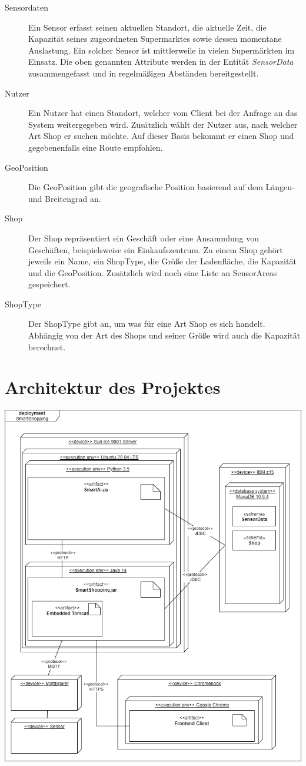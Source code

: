\documentclass[runningheads]{llncs}
\begin{document}
\begin{description}
	\item[Sensordaten] Ein Sensor erfasst seinen aktuellen Standort, die aktuelle Zeit, die Kapazität seines zugeordneten Supermarktes sowie dessen momentane Auslastung. Ein solcher Sensor ist mittlerweile in vielen Supermärkten im Einsatz. Die oben genannten Attribute werden in der Entität \textit{SensorData} zusammengefasst und in regelmäßigen Abständen bereitgestellt.
	\item[Nutzer] Ein Nutzer hat einen Standort, welcher vom Client bei der Anfrage an das System weitergegeben wird. Zusätzlich wählt der Nutzer aus, nach welcher Art Shop er suchen möchte. Auf dieser Basis bekommt er einen Shop und gegebenenfalls eine Route empfohlen.
	\item[GeoPosition] Die GeoPosition gibt die geografische Position basierend auf dem Längen- und Breitengrad an.
	\item[Shop] Der Shop repräsentiert ein Geschäft oder eine Ansammlung von Geschäften, beispielsweise ein Einkaufszentrum. Zu einem Shop gehört jeweils ein Name, ein ShopType, die Größe der Ladenfläche, die Kapazität und die GeoPosition. Zusätzlich wird noch eine Liste an SensorAreas gespeichert.
	\item[ShopType] Der ShopType gibt an, um was für eine Art Shop es sich handelt.
Abhängig von der Art des Shops und seiner Größe wird auch die Kapazität berechnet.
	
\end{description}


\section{Architektur des Projektes}

\includegraphics[width=\linewidth]{images/deployment_diagram}
\end{document}

